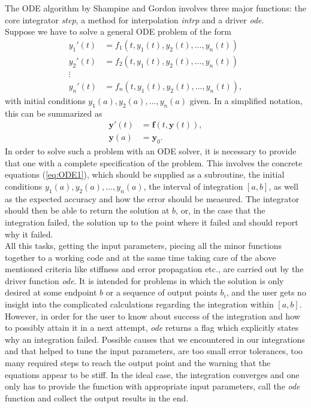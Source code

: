 The ODE algorithm by Shampine and Gordon involves three major functions: the core integrator \textit{step}, a method for interpolation \textit{intrp} and a driver \textit{ode}. \\
Suppose we have to solve a general ODE problem of the form
\begin{align*}
y_1'(t) &= f_1(t,y_1(t),y_2(t),\dots, y_n(t))\\
y_2'(t) &= f_2(t,y_1(t),y_2(t),\dots, y_n(t))\\
\vdots& \\
y_n'(t) &= f_n(t,y_1(t),y_2(t),\dots, y_n(t)),
\end{align*}
with initial conditions $y_1(a), y_2(a),\dots,y_n(a)$ given.
 In a simplified notation, this can be summarized as
\begin{align}
\mathbf{y}'(t) &= \mathbf{f}(t,\mathbf{y}(t)),\\
\label{eq:ODE1}
\mathbf{y}(a) &= \mathbf{y}_0.
\end{align}
In order to solve such a problem with an ODE solver, it is necessary to provide that one with a complete specification of the problem. This involves the concrete equations (\ref{eq:ODE1}), which should be supplied as a subroutine, the initial conditions $y_1(a), y_2(a),\dots,y_n(a)$, the interval of integration $[a,b]$, as well as the expected accuracy and how the error should be measured. The integrator should then be able to return the solution at $b$, or, in the case that the integration failed, the solution up to the point where it failed and should report why it failed. \\
All this tasks, getting the input parameters, piecing all the minor functions together to a working code and at the same time taking care of the above mentioned criteria like stiffness and error propagation etc., are carried out by the driver function \textit{ode}.
It is intended for problems in which the solution is only desired at some endpoint $b$ or a sequence of output points $b_i$, and the user gets no insight into the complicated calculations regarding the integration within $[a,b]$. However, in order for the user to know about success of the integration and how to possibly attain it in a next attempt, \textit{ode} returns a flag which explicitly states why an integration failed. Possible causes that we encountered in our integrations and that helped to tune the input parameters, are too small error tolerances, too many required steps to reach the output point and the warning that the equations appear to be stiff. In the ideal case, the integration converges and one only has to provide the function with appropriate input parameters, call the \textit{ode} function and collect the output results in the end.

